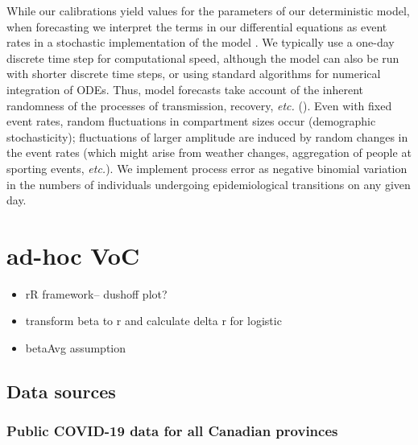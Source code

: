 \documentclass[12pt]{article}\usepackage[]{graphicx}\usepackage[]{color}
\begin{document}
While our calibrations yield values for the parameters of our
deterministic model, when forecasting we interpret the terms in our
differential equations as event rates in a stochastic implementation
of the model \cite{Gill76,Gill01,Gill07}. We typically use a one-day
discrete time step for computational speed, although the model can
also be run with shorter discrete time steps, or using standard
algorithms for numerical integration of ODEs.  Thus, model forecasts
take account of the inherent randomness of the processes of
transmission, recovery, \emph{etc.}  ().  Even
with fixed event rates, random fluctuations in compartment sizes occur
(demographic stochasticity); fluctuations of larger amplitude are
induced by random changes in the event rates (which might arise from
weather changes, aggregation of people at sporting events,
\emph{etc.}). We implement
process error as negative binomial variation in the numbers of
individuals undergoing epidemiological transitions on any given
day.

\section{ad-hoc VoC}

\begin{itemize}
\item{rR framework-- dushoff plot?}
\item{transform beta to r and calculate delta r for logistic}
\item{betaAvg assumption}
\end{itemize}

\subsection{Data sources}


\subsubsection*{Public COVID-19 data for all Canadian provinces}
\end{document}

